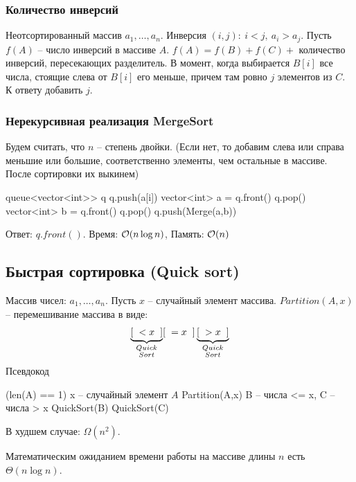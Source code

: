 \begin{multicols}{2}
    \subsubsection*{Количество инверсий}
    Неотсортированный массив $a_1, \ldots, a_n$. Инверсия $(i, j): \ i < j, \ a_i > a_j$. Пусть $f(A)$ -- число инверсий в массиве $A$. $f(A) = f(B) + f(C) + $ количество инверсий, пересекающих разделитель. В момент, когда выбирается $B[i]$ все числа, стоящие слева от $B[i]$ его меньше, причем там ровно $j$ элементов из $C$. К ответу добавить $j$.
    \subsubsection*{Нерекурсивная реализация MergeSort}
    Будем считать, что $n$ -- степень двойки. (Если нет, то добавим слева или справа меньшие или большие, соответственно элементы, чем остальные в массиве. После сортировки их выкинем)
    \begin{algorithmic}[1]
        \State queue<vector<int>> q
        \State q.push({a[i]})
        \EndFor
        \State vector<int> a = q.front()
        \State q.pop()
        \State vector<int> b = q.front()
        \State q.pop()
        \State q.push(Merge(a,b))
        \EndWhile
        \EndFunction
    \end{algorithmic}
    Ответ: $q.front()$. Время: ${\cal O}(n\log n)$, Память: ${\cal O}(n)$
    \subsection*{Быстрая сортировка (Quick sort)}
    Массив чисел: $a_1, \ldots, a_n$. Пусть $x$ -- случайный элемент массива. $Partition(A, x)$ -- перемешивание массива в виде: 
    \[
    \underbrace{[\hspace*{0.2cm} < x \hspace*{0.2cm}]}_{\substack{Quick\\Sort}}[\hspace*{0.2cm} = x \hspace*{0.2cm}] \underbrace{[\hspace*{0.2cm} > x \hspace*{0.2cm}]}_{\substack{Quick\\Sort}}
    \]
    Псевдокод
    \begin{algorithmic}[1]
        \If (len(A) == 1)
        \State \Return
        \EndIf
        \State x -- случайный элемент $A$
        \State Partition(A,x)
        \State B -- числа <= x, C -- числа > x
        \State QuickSort(B)
        \State QuickSort(C)
        \EndFunction
    \end{algorithmic}
    В худшем случае: $\Omega(n^2)$.
    \begin{theorema}{}{}
        Математическим ожиданием времени работы на массиве длины $n$ есть $\Theta(n\log n)$.
    \end{theorema}

\end{multicols}
